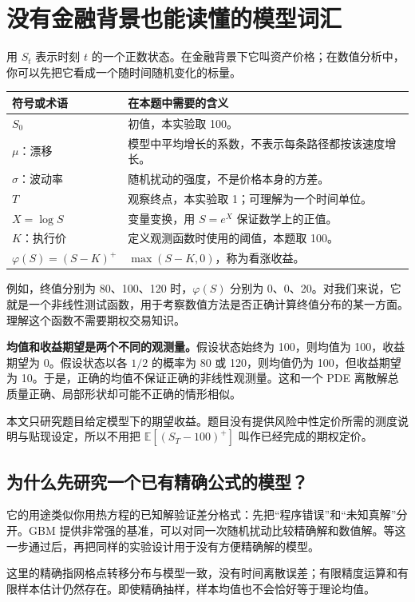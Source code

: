 \documentclass[11pt,a4paper,fontset=none]{ctexart}
\newcommand{\E}{\mathbb E}
\begin{document}
\newpage
\section{没有金融背景也能读懂的模型词汇}
用 $S_t$ 表示时刻 $t$ 的一个正数状态。在金融背景下它叫资产价格；在数值分析中，你可以先把它看成一个随时间随机变化的标量。

\begin{table}[H]\centering
\begin{tabularx}{\textwidth}{@{}lX@{}}\toprule
符号或术语 & 在本题中需要的含义\\\midrule
$S_0$ & 初值，本实验取 100。\\
$\mu$：漂移 & 模型中平均增长的系数，不表示每条路径都按该速度增长。\\
$\sigma$：波动率 & 随机扰动的强度，不是价格本身的方差。\\
$T$ & 观察终点，本实验取 1；可理解为一个时间单位。\\
$X=\log S$ & 变量变换，用 $S=e^X$ 保证数学上的正值。\\
$K$：执行价 & 定义观测函数时使用的阈值，本题取 100。\\
$\varphi(S)=(S-K)^+$ & $\max(S-K,0)$，称为看涨收益。\\\bottomrule
\end{tabularx}
\end{table}

例如，终值分别为 80、100、120 时，$\varphi(S)$ 分别为 0、0、20。对我们来说，它就是一个非线性测试函数，用于考察数值方法是否正确计算终值分布的某一方面。理解这个函数不需要期权交易知识。

\textbf{均值和收益期望是两个不同的观测量。}假设状态始终为 100，则均值为 100，收益期望为 0。假设状态以各 $1/2$ 的概率为 80 或 120，则均值仍为 100，但收益期望为 10。于是，正确的均值不保证正确的非线性观测量。这和一个 PDE 离散解总质量正确、局部形状却可能不正确的情形相似。

本文只研究题目给定模型下的期望收益。题目没有提供风险中性定价所需的测度说明与贴现设定，所以不用把 $\E[(S_T-100)^+]$ 叫作已经完成的期权定价。

\subsection*{为什么先研究一个已有精确公式的模型？}
它的用途类似你用热方程的已知解验证差分格式：先把“程序错误”和“未知真解”分开。GBM 提供非常强的基准，可以对同一次随机扰动比较精确解和数值解。等这一步通过后，再把同样的实验设计用于没有方便精确解的模型。

这里的精确指网格点转移分布与模型一致，没有时间离散误差；有限精度运算和有限样本估计仍然存在。即使精确抽样，样本均值也不会恰好等于理论均值。
\end{document}
